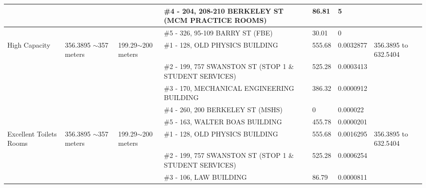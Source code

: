 \begin{table}[H]
{\begin{tabular}{|l|l|l|l|l|l|l|}
                        &                           &                                                 & \#4 - 204, 208-210 BERKELEY ST (MCM PRACTICE ROOMS)     & 86.81         & 5               &                           \\ \hline
                        &                           &                                                 & \#5 - 326, 95-109 BARRY ST (FBE)                        & 30.01         & 0               &                           \\ \hline
High Capacity           & 356.3895 $\sim$357 meters & 199.29$\sim$200 meters                          & \#1 - 128, OLD PHYSICS BUILDING                         & 555.68        & 0.0032877       & 356.3895 to 632.5404      \\ \hline
                        &                           &                                                 & \#2 - 199, 757 SWANSTON ST (STOP 1 \& STUDENT SERVICES) & 525.28        & 0.0003413       &                           \\ \hline
                        &                           &                                                 & \#3 - 170, MECHANICAL ENGINEERING BUILDING              & 386.32        & 0.0000912       &                           \\ \hline
                        &                           &                                                 & \#4 - 260, 200 BERKELEY ST (MSHS)                       & 0             & 0.000022        &                           \\ \hline
                        &                           &                                                 & \#5 - 163, WALTER BOAS BUILDING                         & 455.78        & 0.0000201       &                           \\ \hline
Excellent Toilets Rooms & 356.3895 $\sim$357 meters & 199.29$\sim$200 meters                          & \#1 - 128, OLD PHYSICS BUILDING                         & 555.68        & 0.0016295       & 356.3895 to 632.5404      \\ \hline
                        &                           &                                                 & \#2 - 199, 757 SWANSTON ST (STOP 1 \& STUDENT SERVICES) & 525.28        & 0.0006254       &                           \\ \hline
                        &                           &                                                 & \#3 - 106, LAW BUILDING                                 & 86.79         & 0.0000811       &                           \\ \hline

\end{tabular}}
\end{table}
